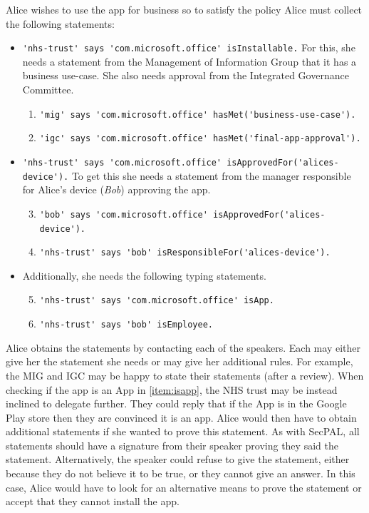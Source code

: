 \documentclass{llncs}
\begin{document}
Alice wishes to use the app for business so to satisfy the policy Alice must collect the following statements:
\begin{itemize}
    \newcommand{\weitemsize}[0]{\footnotesize}
  \item {\weitemsize \lstinline{'nhs-trust' says 'com.microsoft.office' isInstallable.}\newline}
    For this, she needs a statement from the Management of Information Group that it has a business use-case.
    She also needs approval from the Integrated Governance Committee.
    \begin{enumerate}\setcounter{enumi}{0}
      \item {\weitemsize \lstinline{'mig' says 'com.microsoft.office' hasMet('business-use-case').}}
      \item {\weitemsize \lstinline{'igc' says 'com.microsoft.office' hasMet('final-app-approval').}}
    \end{enumerate}
  \item {\weitemsize \lstinline{'nhs-trust' says 'com.microsoft.office' isApprovedFor('alices-device').}}
    To get this she needs a statement from the manager responsible for Alice's device (\emph{Bob}) approving the app.
    \begin{enumerate}\setcounter{enumi}{2}
      \item {\weitemsize \lstinline{'bob' says 'com.microsoft.office' isApprovedFor('alices-device').}}
      \item {\weitemsize \lstinline{'nhs-trust' says 'bob' isResponsibleFor('alices-device').}}
    \end{enumerate}
  \item Additionally, she needs the following typing statements.
    \begin{enumerate}\setcounter{enumi}{4}
      \item {\weitemsize \lstinline{'nhs-trust' says 'com.microsoft.office' isApp.}} \label{item:isapp}
      \item {\weitemsize \lstinline{'nhs-trust' says 'bob' isEmployee.}}
    \end{enumerate}
\end{itemize}

Alice obtains the statements by contacting each of the speakers. 
Each may either give her the statement she needs or may give her additional rules.
For example, the MIG and IGC may be happy to state their statements (after a review).
When checking if the app is an App in \autoref{item:isapp}, the NHS trust may be instead inclined to delegate further.
They could reply that if the App is in the Google Play store then they are convinced it is an app.
Alice would then have to obtain additional statements if she wanted to prove this statement.
As with SecPAL, all statements should have a signature from their speaker proving they said the statement.
Alternatively, the speaker could refuse to give the statement, either because they do not believe it to be true, or they cannot give an answer.
In this case, Alice would have to look for an alternative means to prove the statement or accept that they cannot install the app.
\end{document}
